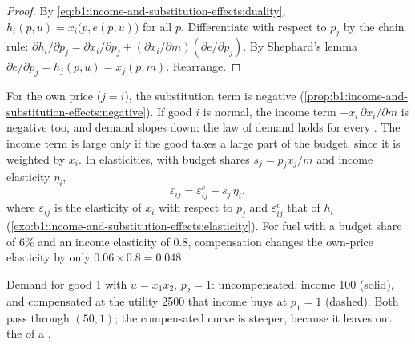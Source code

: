 \begin{proof}
By \eqref{eq:b1:income-and-substitution-effects:duality},
$h_i(p, u) = x_i\bigl(p, e(p, u)\bigr)$ for all $p$. Differentiate with respect
to $p_j$ by the chain rule:
$\partial h_i/\partial p_j = \partial x_i/\partial p_j + (\partial x_i/\partial m)(\partial e/\partial p_j)$.
By Shephard's lemma $\partial e/\partial p_j = h_j(p, u) = x_j(p, m)$. Rearrange.
\end{proof}

For the own price ($j = i$), the substitution term is negative
(\cref{prop:b1:income-and-substitution-effects:negative}). If good $i$ is
normal, the income term $-x_i\,\partial x_i/\partial m$ is negative too, and
demand slopes down: the law of demand holds for every . The
income term is large only if the good takes a large part of the budget,
since it is weighted by $x_i$. In elasticities, with budget shares
$s_j = p_jx_j/m$ and income elasticity $\eta_i$,
\[
\varepsilon_{ij} = \varepsilon^{c}_{ij} - s_j\,\eta_i ,
\]
where $\varepsilon_{ij}$ is the elasticity of $x_i$ with respect to $p_j$ and
$\varepsilon^{c}_{ij}$ that of $h_i$ (\cref{exo:b1:income-and-substitution-effects:elasticity}).
For fuel with a budget share of $6\%$ and an income elasticity of $0.8$,
compensation changes the own-price elasticity by only
$0.06 \times 0.8 = 0.048$.

\begin{omfigure}

{\small Demand for good 1 with $u = x_1x_2$, $p_2 = 1$: uncompensated, income 100
(solid), and compensated at the utility 2500 that income buys at
$p_1 = 1$ (dashed). Both pass through $(50, 1)$; the compensated curve is
steeper, because it leaves out the  of a .}
\end{omfigure}

